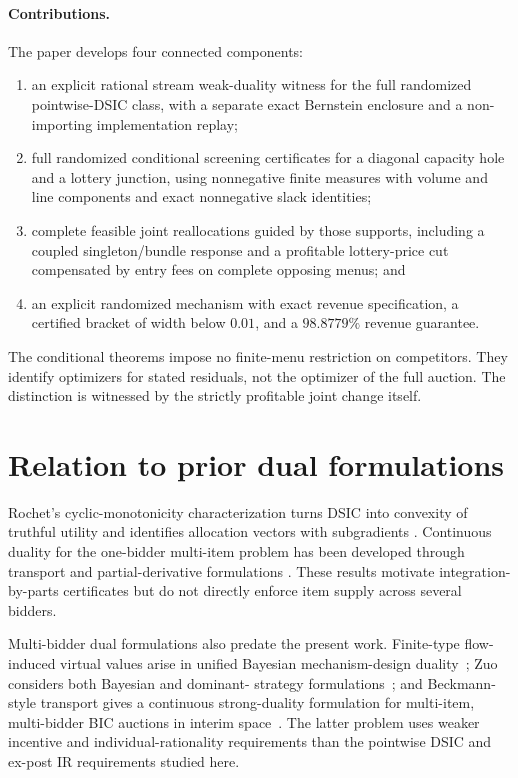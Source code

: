 \documentclass[11pt]{article}
\begin{document}
\paragraph{Contributions.}
The paper develops four connected components:
\begin{enumerate}
\item an explicit rational stream weak-duality witness for the full
randomized pointwise-DSIC class, with a separate exact Bernstein enclosure
and a non-importing implementation replay;
\item full randomized conditional screening certificates for a diagonal
capacity hole and a lottery junction, using nonnegative finite measures
with volume and line components and exact nonnegative slack identities;
\item complete feasible joint reallocations guided by those supports,
including a coupled singleton/bundle response and a profitable lottery-price
cut compensated by entry fees on complete opposing menus; and
\item an explicit randomized mechanism with exact revenue specification,
a certified bracket of width below $0.01$, and a $98.8779\%$ revenue guarantee.
\end{enumerate}
The conditional theorems impose no finite-menu restriction on competitors.
They identify optimizers for stated residuals, not the optimizer of the full
auction. The distinction is witnessed by the strictly profitable joint
change itself.

\section{Relation to prior dual formulations}

Rochet's cyclic-monotonicity characterization turns DSIC into convexity of
truthful utility and identifies allocation vectors with subgradients
\citep{rochet1987}.  Continuous duality for the one-bidder multi-item problem
has been developed through transport and partial-derivative formulations
\citep{daskalakis2017strong,giannakopoulos2018duality}.  These results motivate
integration-by-parts certificates but do not directly enforce item supply
across several bidders.

Multi-bidder dual formulations also predate the present work.  Finite-type
flow-induced virtual values arise in unified Bayesian mechanism-design
duality~\citep{cai2018duality}; Zuo considers both Bayesian and dominant-
strategy formulations~\citep{zuo2017}; and Beckmann-style transport gives a
continuous strong-duality formulation for multi-item, multi-bidder BIC
auctions in interim space~\citep{kolesnikov2022beckmann}.  The latter problem
uses weaker incentive and individual-rationality requirements than the
pointwise DSIC and ex-post IR requirements studied here.
\end{document}
